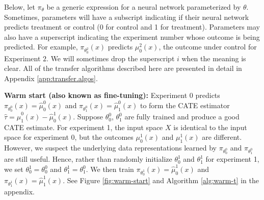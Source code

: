 Below, let $\pi_{\theta}$ be a generic expression for a neural network parameterized by $\theta$. Sometimes, parameters will have a subscript indicating if their neural network predicts treatment or control (0 for control and 1 for treatment). Parameters may also have a superscript indicating the experiment number whose outcome is being predicted. For example, $\pi_{\theta_0^2}(x)$ predicts $\mu^2_0(x)$, the outcome under control for Experiment $2$. We will sometimes drop the superscript $i$ when the meaning is clear. All of the transfer algorithms described here are presented in detail in Appendix \ref{app:transfer.algos}.

\textbf{Warm start (also known as fine-tuning):} Experiment $0$ predicts $\pi_{\theta^0_0}(x) = \hat{\mu}^0_0(x)$ and $\pi_{\theta^0_1}(x) = \hat{\mu}^0_1(x)$ to form the CATE estimator $\hat{\tau} = \hat{\mu}^0_1(x) - \hat{\mu}^1_0(x)$. Suppose $\theta^0_0$, $\theta^0_1$ are fully trained and produce a good CATE estimate. For experiment 1, the input space $X$ is identical to the input space for experiment $0$, but the outcomes $\mu^1_0(x)$ and $\mu^1_1(x)$ are different. %
However, we suspect the underlying data representations learned by $\pi_{\theta^0_0}$ and $\pi_{\theta^0_1}$ are still useful. Hence, rather than randomly initialize $\theta_0^1$ and $\theta_1^1$ for experiment 1, we set $\theta_0^1 = \theta_0^0$ and $\theta_1^1 = \theta_1^0$. We then train $\pi_{\theta_0^1}(x) = \hat{\mu}^1_0(x)$ and $\pi_{\theta_1^1}(x) = \hat{\mu}^1_1(x)$. See Figure \ref{fig:warm-start} and Algorithm \ref{alg:warm-t} in the appendix.


